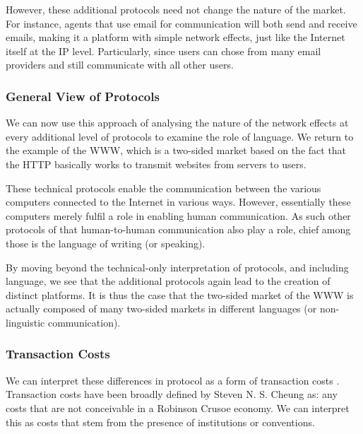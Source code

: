 \documentclass[a4paper,british]{article}\usepackage[]{graphicx}\usepackage[]{color}
\begin{document}
However, these additional protocols need not change the nature of
the market. For instance, agents that use email for communication
will both send and receive emails, making it a platform with simple
network effects, just like the Internet itself at the IP level. Particularly,
since users can chose from many email providers and still communicate
with all other users. 

\subsubsection*{General View of Protocols}

We can now use this approach of analysing the nature of the network
effects at every additional level of protocols to examine the role
of language. We return to the example of the WWW, which is a two-sided
market based on the fact that the HTTP basically works to transmit
websites from servers to users. 

These technical protocols enable the communication between the various
computers connected to the Internet in various ways. However, essentially
these computers merely fulfil a role in enabling human communication.
As such other protocols of that human-to-human communication also
play a role, chief among those is the language of writing (or speaking).

By moving beyond the technical-only interpretation of protocols, and
including language, we see that the additional protocols again lead
to the creation of distinct platforms. It is thus the case that the
two-sided market of the WWW is actually composed of many two-sided
markets in different languages (or non-linguistic communication). 

\subsubsection*{Transaction Costs}

We can interpret these differences in protocol as a form of transaction
costs \citep{coase1937nature}. Transaction costs have been broadly
defined by Steven N. S. Cheung as: \textquotedbl{}any costs that are
not conceivable in a \textquotedbl{}Robinson Crusoe economy\textquotedbl{}.
We can interpret this as costs that stem from the presence of institutions
or conventions.
\end{document}
